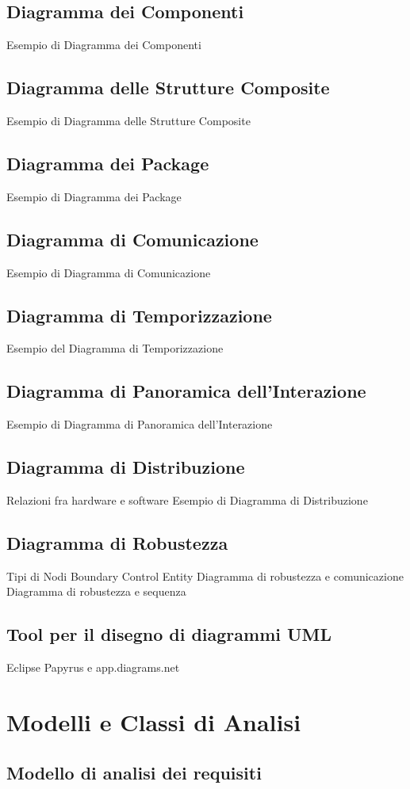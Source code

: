 \documentclass{article}
\begin{document}
	\subsection{Diagramma dei Componenti}
	Esempio di Diagramma dei Componenti
	\subsection{Diagramma delle Strutture Composite}
	Esempio di Diagramma delle Strutture Composite
	\subsection{Diagramma dei Package}
	Esempio di Diagramma dei Package
	\subsection{Diagramma di Comunicazione}
	Esempio di Diagramma di Comunicazione
	\subsection{Diagramma di Temporizzazione}
	Esempio del Diagramma di Temporizzazione
	\subsection{Diagramma di Panoramica dell’Interazione}
	Esempio di Diagramma di Panoramica dell’Interazione
	\subsection{Diagramma di Distribuzione}
	Relazioni fra hardware e software
	Esempio di Diagramma di Distribuzione
	\subsection{Diagramma di Robustezza}
	Tipi di Nodi
	Boundary
	Control
	Entity
	Diagramma di robustezza e comunicazione
	Diagramma di robustezza e sequenza
	\subsection{Tool per il disegno di diagrammi UML}
	Eclipse Papyrus e app.diagrams.net
	
	\section{Modelli e Classi di Analisi}
	\subsection{Modello di analisi dei requisiti}
\end{document}
